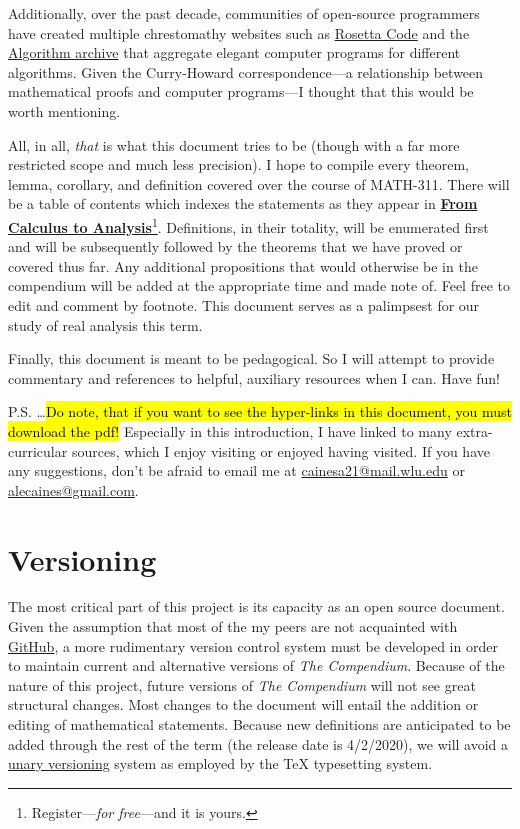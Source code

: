 \documentclass[11pt]{book}
\newcounter{theorem}
\newcounter{lemma}
\newcounter{definition}
\newcounter{corollary}
\begin{document}
    Additionally, over the past decade, communities of open-source programmers have created multiple chrestomathy websites
    such as \href{http://rosettacode.org/wiki/Rosetta_Code}{Rosetta Code} and the 
    \href{https://www.algorithm-archive.org/}{Algorithm archive} that 
    aggregate elegant computer programs for different algorithms.
    Given the Curry-Howard correspondence---a relationship between mathematical proofs and computer programs---I 
    thought that this would be worth mentioning. 
    

    All, in all, \emph{that} is what this document tries to be (though with a far more restricted scope and much less precision).
    I hope to compile every theorem, lemma, corollary,
and definition covered over the course of MATH-311. There will be a table of
contents which indexes the statements as they appear in \textbf{\href{https://www.academia.edu/35915359/From_Calculus_to_Analysis_-_Steen_Pedersen_Springer_}{From Calculus to Analysis}}\footnote{Register---\emph{for free}---and it is yours.}.
Definitions, in their totality, will be enumerated first and will be subsequently followed by 
the theorems that we have proved or covered thus far.
Any additional propositions that would otherwise be in the compendium will be 
added at the appropriate time and made note of. Feel free to edit and comment by footnote.
This document serves as a palimpsest for our study of real analysis this term.

	Finally, this document is meant to be pedagogical. So I will attempt to provide commentary and references to helpful,
	auxiliary resources when I can. Have fun!

	P.S. \dots \textcolor{red}{\hl{Do note, that if you want to see the hyper-links in this document, you must download the pdf!}} Especially in this introduction, I have linked to many extra-curricular
sources, which I enjoy visiting or enjoyed having visited. If you have any suggestions, don't be afraid to email me
at \href{mailto:cainesa21@mail.wlu.edu}{cainesa21@mail.wlu.edu} or \href{mailto:alecaines@gmail.com}{alecaines@gmail.com}.
\newpage

\section*{Versioning}
The most critical part of this project is its capacity as an open source document. Given the assumption that most of the my peers are not acquainted with 
\href{https://github.com/features#team-management}{GitHub}, a more rudimentary version control system must be developed in order to maintain current and alternative 
versions of \emph{The Compendium}. Because of the nature of this project, future versions of \emph{The Compendium} will not see great structural changes. Most changes
to the document will entail the addition or editing of mathematical statements. Because new definitions are anticipated to be added through the rest of the term (the 
release date is 4/2/2020), we will avoid a \href{https://en.wikipedia.org/wiki/Unary_numeral_system}{unary versioning} system as employed by the TeX typesetting system.
\end{document}
